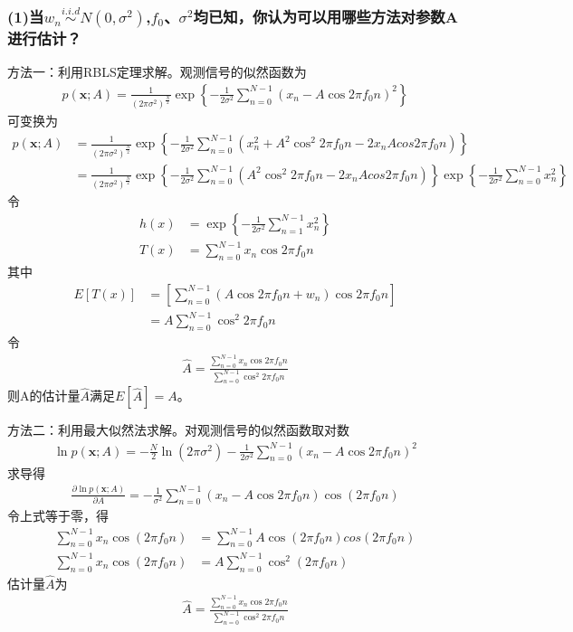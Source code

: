 \documentclass[fontset=windows]{article}
\numberwithin{figure}{section}
\begin{document}
\subsubsection*{(1)当\(w_n\overset{i.i.d}{\sim} N(0,\sigma^2)\),\(f_0\)、\(\sigma^2\)均已知，你认为可以用哪些方法对参数A进行估计？}

方法一：利用RBLS定理求解。观测信号的似然函数为
\begin{align*}
	p(\mathbf{x};A)=\frac{1}{(2\pi \sigma ^2)^{\frac{N}{2}}}\exp\left\{ -\frac{1}{2\sigma^2}
	\sum_{n=0}^{N-1}(x_n-A\cos2\pi f_0 n)^2	\right\}
\end{align*}
可变换为
\begin{align*}
	p(\mathbf{x};A) & =\frac{1}{(2\pi \sigma^2)^{\frac{N}{2}}}\exp\left\{-\frac{1}{2\sigma^2}
	\sum_{n=0}^{N-1}(x_n^2 +A^2\cos^2 2\pi f_0 n-2x_n A cos 2\pi f_0 n)\right\}               \\
	                & =\frac{1}{(2\pi \sigma^2)^{\frac{N}{2}}}\exp\left\{-\frac{1}{2\sigma^2}
	\sum_{n=0}^{N-1}(A^2\cos^2 2\pi f_0 n-2x_n A cos 2\pi f_0 n)\right\}
	\exp\left\{-\frac{1}{2\sigma^2}\sum_{n=0}^{N-1}x_n^2\right\}
\end{align*}
令
\begin{align*}
	h(x) & =\exp\left\{-\frac{1}{2\sigma^2}\sum_{n=1}^{N-1}x_n^2\right\} \\
	T(x) & =\sum_{n=0}^{N-1}x_n \cos 2\pi f_0 n
\end{align*}
其中
\begin{align*}
	E[T(x)] & =\left[\sum_{n=0}^{N-1}(A\cos 2\pi f_0 n+w_n)\cos 2\pi f_0 n \right] \\
	        & =A\sum_{n=0}^{N-1}\cos^2 2\pi f_0 n
\end{align*}
令
\begin{align*}
	\hat{A}=\frac{\sum_{n=0}^{N-1}x_n \cos 2\pi f_0 n}{\sum_{n=0}^{N-1}\cos^2 2\pi f_0 n}
\end{align*}
则A的估计量\(\hat{A}\)满足\(E[\hat{A}]=A\)。

方法二：利用最大似然法求解。对观测信号的似然函数取对数
\begin{align*}
	\ln p(\mathbf{x};A)=-\frac{N}{2}\ln (2\pi \sigma^2)-
	\frac{1}{2\sigma^2}\sum_{n=0}^{N-1}(x_n-A\cos 2\pi f_0 n)^2
\end{align*}
求导得
\begin{align*}
	\frac{\partial\ln p(\mathbf{x};A)}{\partial A}=-\frac{1}{\sigma^2}
	\sum_{n=0}^{N-1}(x_n-A\cos2\pi f_0 n)\cos(2\pi f_0 n)
\end{align*}
令上式等于零，得
\begin{align*}
	\sum_{n=0}^{N-1}x_n\cos(2\pi f_0 n) & =\sum_{n=0}^{N-1}A\cos(2\pi f_0 n)cos(2\pi f_0 n) \\
	\sum_{n=0}^{N-1}x_n\cos(2\pi f_0 n) & =A\sum_{n=0}^{N-1}\cos^2(2\pi f_0 n)
\end{align*}
估计量\(\hat{A}\)为
\begin{align*}
	\hat{A}=\frac{\sum_{n=0}^{N-1}x_n \cos 2\pi f_0 n}{\sum_{n=0}^{N-1}\cos^2 2\pi f_0 n}
\end{align*}
\end{document}
